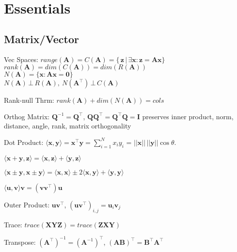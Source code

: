 \section{Essentials}
\subsection*{Matrix/Vector}
\begin{compactdesc}
    \item[Vec Spaces:]
    $\mathit{range}(\mathbf{A}) = C(\mathbf{A})= \{\,\textbf{z}\, |\, \exists \textbf{x}: \textbf{z}=\textbf{Ax}\}$ \\
    $\mathit{rank}(\mathbf{A}) = dim(C(\mathbf{A})) =dim(R(\mathbf{A}))$ \\
    $\mathit{N}(\mathbf{A}) = \{\mathbf{x}: \mathbf{Ax}=\mathbf{0}\}$\\
    $N(\mathbf{A})\,\bot\,R(\mathbf{A}),\  N(\mathbf{A}^\top)\,\bot\,C(\mathbf{A})$
    \item[Rank-null Thrm:]
    $\textit{rank}(\textbf{A})+\textit{dim}(N(\textbf{A})) = cols$
    
	\item[Orthog Matrix:] $\mathbf{Q}^{-1} = \mathbf{Q}^\top$, $\mathbf{Q} \mathbf{Q}^\top = \mathbf{Q}^\top \mathbf{Q} = \mathbf{I}$
	preserves inner product, norm, distance, angle, rank, matrix orthogonality 
	
	\item[Dot Product:] $\langle \mathbf{x}, \mathbf{y} \rangle = \mathbf{x}^\top \mathbf{y} = \sum_{i=1}^{N} x_i y_i$ = $||\mathbf{x}||\,||\mathbf{y}||\cos{\theta}$.
	\begin{inparaitem}[\color{red}\textbullet]
	\item $\langle \mathbf{x} + \mathbf{y}, \mathbf{z} \rangle = \langle \mathbf{x}, \mathbf{z} \rangle + \langle \mathbf{y}, \mathbf{z} \rangle$
	\item $\langle \mathbf{x} \pm \mathbf{y}, \mathbf{x} \pm \mathbf{y} \rangle = \langle \mathbf{x}, \mathbf{x} \rangle \pm 2 \langle \mathbf{x}, \mathbf{y} \rangle + \langle \mathbf{y}, \mathbf{y} \rangle$
	\item $\langle \mathbf{u}, \mathbf{v} \rangle \mathbf{v} = (\mathbf{v}\mathbf{v}^\top)\mathbf{u}$
	\end{inparaitem}
	\item[Outer Product:] $\mathbf{u} \mathbf{v}^\top$, $(\mathbf{u} \mathbf{v}^\top)_{i, j} = \mathbf{u}_i \mathbf{v}_j$
    \item[Trace:] $\mathit{trace}(\mathbf{XYZ})=\mathit{trace}(\mathbf{ZXY})$
	\item[Transpose:] $(\mathbf{A}^\top)^{-1} = (\mathbf{A}^{-1})^\top$,  $(\mathbf{A}\mathbf{B})^\top= \mathbf{B}^\top\mathbf{A}^\top$
\end{compactdesc}


